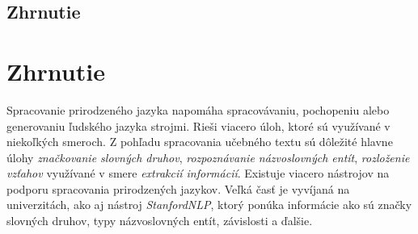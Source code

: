 %
%
{
	\subsection{Zhrnutie}
}
{
	\section{Zhrnutie}
}
\label{analysis:zhrnutie}
Spracovanie prirodzeného jazyka napomáha spracovávaniu, pochopeniu alebo generovaniu ľudského jazyka strojmi. Rieši viacero úloh, ktoré sú využívané v niekoľkých smeroch. Z pohľadu spracovania učebného textu sú dôležité hlavne úlohy \textit{značkovanie slovných druhov}, \textit{rozpoznávanie názvoslovných entít}, \textit{rozloženie vzťahov} využívané v smere \textit{extrakcií informácií}. Existuje viacero nástrojov na podporu spracovania prirodzených jazykov. Veľká časť je vyvíjaná na univerzitách, ako aj nástroj \textit{StanfordNLP}, ktorý ponúka informácie ako sú značky slovných druhov, typy názvoslovných entít, závislosti a ďalšie.